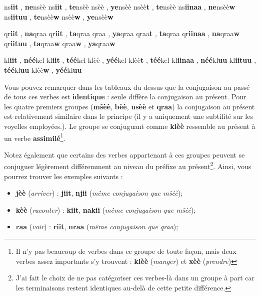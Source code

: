     {ns\textbf{iit} , \textbf{ne}nsèè}
    {ns\textbf{iit} , \textbf{te}nsèè}
    {nsèè , \textbf{ye}nsèè}
    {nsèè\textbf{t} , \textbf{te}nsèè}
    {ns\textbf{iinaa} , \textbf{ne}nsèè\textbf{w}}
    {ns\textbf{iituu} , \textbf{te}nsèè\textbf{w}}
    {nsèè\textbf{w} , \textbf{ye}nsèè\textbf{w}}

    {qr\textbf{iit} , \textbf{na}qraa}
    {qr\textbf{iit} , \textbf{ta}qraa}
    {qraa , \textbf{ya}qraa}
    {qraa\textbf{t} , \textbf{ta}qraa}
    {qr\textbf{iinaa} , \textbf{na}qraa\textbf{w}}
    {qr\textbf{iituu} , \textbf{ta}qraa\textbf{w}}
    {qraa\textbf{w} , \textbf{ya}qraa\textbf{w}}

    {kl\textbf{iit} , \textbf{néé}kel}
    {kl\textbf{iit} , \textbf{téé}kel}
    {klèè , \textbf{yéé}kel}
    {klèè\textbf{t} , \textbf{téé}kel}
    {kl\textbf{iinaa} , \textbf{néé}kl\textbf{uu}}
    {kl\textbf{iituu} , \textbf{téé}kl\textbf{uu}}
    {klèè\textbf{w} , \textbf{yéé}kl\textbf{uu}}

Vous pouvez remarquer dans les tableaux du dessus que la conjugaison au passé de tous ces verbes est \textbf{identique} : seule diffère la conjugaison au présent. Pour les quatre premiers groupes (\textbf{m\v{s}èè}, \textbf{\textcrh bèè}, \textbf{nsèè} et \textbf{qraa}) la conjugaison au présent est relativement similaire dans le principe (il y a uniquement une subtilité sur les voyelles employées.). Le groupe se conjuguant comme \textbf{klèè} ressemble au présent à un verbe \textbf{assimilé}\footnote{Il n'y pas beaucoup de verbes dans ce groupe de toute façon, mais deux verbes assez importants s'y trouvent : \textbf{klèè} (\textit{manger}) et \textbf{x\dh èè} (\textit{prendre})}.

Notez également que certains des verbes appartenant à ces groupes peuvent se conjuguer légèrement différemment au niveau du préfixe au présent\footnote{J'ai fait le choix de ne pas catégoriser ces verbes-là dans un groupe à part car les terminaisons restent identiques au-delà de cette petite différence.}. Ainsi, vous pourrez trouver les exemples suivants : 
\begin{itemize}
    \item \textbf{jèè} (\textit{arriver}) : \textbf{jiit}, \textbf{njii} (\textit{même conjugaison que m\v{s}èè});
    \item \textbf{\textcrh kèè} (\textit{raconter}) : \textbf{\textcrh kiit}, \textbf{na\textcrh kii} (\textit{même conjugaison que m\v{s}èè}); 
    \item \textbf{raa} (\textit{voir}) : \textbf{riit}, \textbf{nraa} (\textit{même conjugaison que qraa}); 
\end{itemize}

